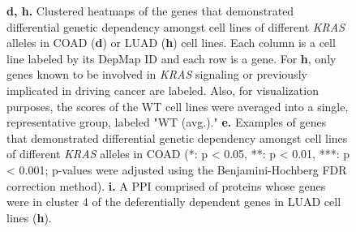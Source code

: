 \documentclass[english, 10pt, letterpaper]{article}
\newcommand{\KRAS}{\emph{KRAS}}
\begin{document}
\begin{figure}
{    \textbf{d, h.} Clustered heatmaps of the genes that demonstrated differential genetic dependency amongst cell lines of different \KRAS{} alleles in COAD (\textbf{d}) or LUAD (\textbf{h}) cell lines. Each column is a cell line labeled by its DepMap ID and each row is a gene. For \textbf{h}, only genes known to be involved in \KRAS{} signaling or previously implicated in driving cancer are labeled. Also, for visualization purposes, the scores of the WT cell lines were averaged into a single, representative group, labeled "WT (avg.)."
    \textbf{e.} Examples of genes that demonstrated differential genetic dependency amongst cell lines of different \KRAS{} alleles in COAD (*: p < 0.05, **: p < 0.01, ***: p < 0.001; p-values were adjusted using the Benjamini-Hochberg FDR correction method).
    \textbf{i.} A PPI comprised of proteins whose genes were in cluster 4 of the deferentially dependent genes in LUAD cell lines (\textbf{h}).
}
\label{fig:coadluad-dependency-main}
\end{figure}
\end{document}
